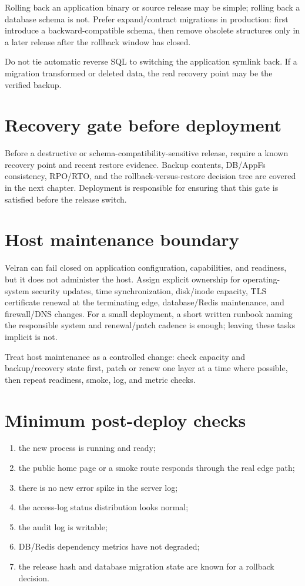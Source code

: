 Rolling back an application binary or source release may be simple; rolling back a database schema is not. Prefer expand/contract migrations in production: first introduce a backward-compatible schema, then remove obsolete structures only in a later release after the rollback window has closed.

Do not tie automatic reverse SQL to switching the application symlink back. If a migration transformed or deleted data, the real recovery point may be the verified backup.

\section{Recovery gate before deployment}

Before a destructive or schema-compatibility-sensitive release, require a known recovery point and recent restore evidence. Backup contents, DB/AppFs consistency, RPO/RTO, and the rollback-versus-restore decision tree are covered in the next chapter. Deployment is responsible for ensuring that this gate is satisfied before the release switch.

\section{Host maintenance boundary}

Velran can fail closed on application configuration, capabilities, and readiness, but it does not administer the host. Assign explicit ownership for operating-system security updates, time synchronization, disk/inode capacity, TLS certificate renewal at the terminating edge, database/Redis maintenance, and firewall/DNS changes. For a small deployment, a short written runbook naming the responsible system and renewal/patch cadence is enough; leaving these tasks implicit is not.

Treat host maintenance as a controlled change: check capacity and backup/recovery state first, patch or renew one layer at a time where possible, then repeat readiness, smoke, log, and metric checks.

\section{Minimum post-deploy checks}

\begin{enumerate}
  \item the new process is running and ready;
  \item the public home page or a smoke route responds through the real edge path;
  \item there is no new error spike in the server log;
  \item the access-log status distribution looks normal;
  \item the audit log is writable;
  \item DB/Redis dependency metrics have not degraded;
  \item the release hash and database migration state are known for a rollback decision.
\end{enumerate}


